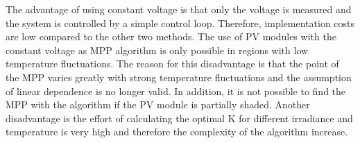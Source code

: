 \label{MPPTselection}

The advantage of using constant voltage is that only the voltage is measured and the system is controlled by a simple control loop. Therefore, implementation costs are low compared to the other two methods. The use of PV modules with the constant voltage as MPP algorithm is only possible in regions with low temperature fluctuations. The reason for this disadvantage is that the point of the MPP varies greatly with strong temperature fluctuations and the assumption of linear dependence is no longer valid. In addition, it is not possible to find the MPP with the algorithm if the PV module is partially shaded. Another disadvantage is the effort of calculating the optimal K for different irradiance and temperature is very high and therefore the complexity of the algorithm increase. \newline

